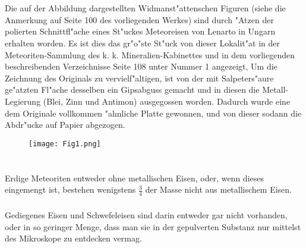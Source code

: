 \documentclass[a4paper, 11pt, oneside, polutonikogreek, german]{article}
\begin{document}
\section{}
\paragraph{}
Die auf der Abbildung dargestellten Widmanst"attenschen Figuren (siehe die Anmerkung auf Seite 100 des vorliegenden Werkes) sind durch "Atzen der polierten Schnittfl"ache eines St"uckes Meteoreisen von Lenarto in Ungarn erhalten worden. Es ist dies das gr"o"ste St"uck von dieser Lokalit"at in der Meteoriten-Sammlung des k. k. Mineralien-Kabinettes und in dem vorliegenden beschreibenden Verzeichnisse Seite 108 unter Nummer 1 angezeigt, Um die Zeichnung des Originals zu vervielf"altigen, ist von der mit Salpeters"aure ge"atzten Fl"ache desselben ein Gipsabguss gemacht und in diesen die Metall-Legierung (Blei, Zinn und Antimon) ausgegossen worden. Dadurch wurde eine dem Originale vollkommen "ahnliche Platte gewonnen, und von dieser sodann die Abdr"ucke auf Papier abgezogen.
\clearpage
\begin{figure}[b]
\centering
\texttt{[image: Fig1.png]}
\end{figure}
\clearpage
\section{}
\subsection{}
\paragraph{}
Erdige Meteoriten entweder ohne metallischen Eisen, oder, wenn dieses eingemengt ist, bestehen wenigstens $\mathfrak{\frac{3}{4}}$ der Masse nicht aus metallischem Eisen.
\subsubsection{}
\paragraph{}
Gediegenes Eisen und Schwefeleisen sind darin entweder gar nicht vorhanden, oder in so geringer Menge, dass man sie in der gepulverten Substanz nur mittelst des Mikroskope zu entdecken vermag.
\end{document}
